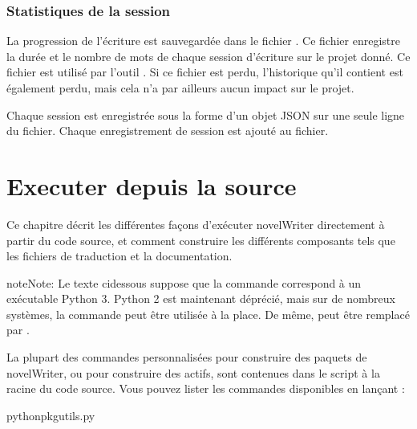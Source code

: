 \documentclass[a4paper,11pt,french]{sphinxmanual}
\begin{document}
\subsection{Statistiques de la session}
\label{\detokenize{tech_storage:session-stats}}
\sphinxAtStartPar
La progression de l’écriture est sauvegardée dans le fichier . Ce fichier enregistre la durée et le nombre de mots de chaque session d’écriture sur le projet donné. Ce fichier est utilisé par l’outil . Si ce fichier est perdu, l’historique qu’il contient est également perdu, mais cela n’a par ailleurs aucun impact sur le projet.

\sphinxAtStartPar
Chaque session est enregistrée sous la forme d’un objet JSON sur une seule ligne du fichier. Chaque enregistrement de session est ajouté au fichier.

\sphinxstepscope


\chapter{Executer depuis la source}
\label{\detokenize{tech_source:running-from-source}}\label{\detokenize{tech_source:a-source}}\label{\detokenize{tech_source::doc}}
\sphinxAtStartPar
Ce chapitre décrit les différentes façons d’exécuter novelWriter directement à partir du code source, et comment construire les différents composants tels que les fichiers de traduction et la documentation.

\begin{sphinxadmonition}{note}{Note:}
\sphinxAtStartPar
Le texte ci\sphinxhyphen{}dessous suppose que la commande  correspond à un exécutable Python 3. Python 2 est maintenant déprécié, mais sur de nombreux systèmes, la commande  peut être utilisée à la place. De même,  peut être remplacé par .
\end{sphinxadmonition}

\sphinxAtStartPar
La plupart des commandes personnalisées pour construire des paquets de novelWriter, ou pour construire des actifs, sont contenues dans le script  à la racine du code source. Vous pouvez lister les commandes disponibles en lançant :

\begin{sphinxVerbatim}[commandchars=\\\{\}]
pythonpkgutils.py
\end{sphinxVerbatim}
\end{document}
